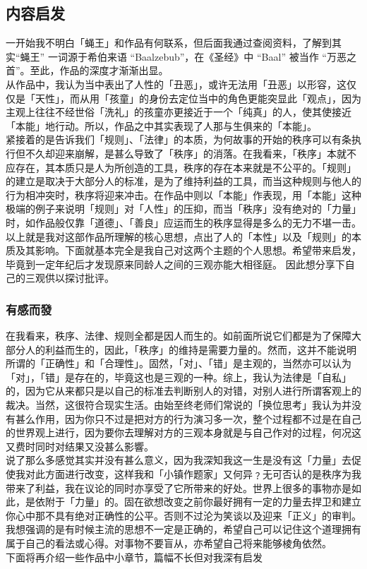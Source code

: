 \documentclass[supercite]{Experimental_Report}
\theoremstyle{definition}
\begin{document}
\subsection{内容启发}
一开始我不明白「蝇王」和作品有何联系，但后面我通过查阅资料，了解到其实“蝇王” 一词源于希伯来语 “Baalzebub”，在《圣经》中 “Baal” 被当作 “万恶之首”。至此，作品的深度才渐渐出显。
\\从作品中，我认为当中表出了人性的「丑恶」，或许无法用「丑恶」以形容，这仅仅是「天性」，而从用「孩童」的身份去定位当中的角色更能突显此「观点」，因为主观上往往不经世俗「洗礼」的孩童亦更接近于一个「纯真」的人，使其使接近「本能」地行动。所以，作品之中其实表现了人那与生俱来的「本能」。
\\紧接着的是告诉我们「规则」、「法律」的本质，为何故事的开始的秩序可以有条执行但不久却迎来崩解，是甚么导致了「秩序」的消落。在我看来，「秩序」本就不应存在，其本质只是人为所创造的工具，秩序的存在本来就是不公平的。「规则」的建立是取决于大部分人的标准，是为了维持利益的工具，而当这种规则与他人的行为相冲突时，秩序将迎来冲击。在作品中则以「本能」作表现，用「本能」这种极端的例子来说明「规则」对「人性」的压抑，而当「秩序」没有绝对的「力量」时，如作品般仅靠「道德」、「善良」应运而生的秩序显得是多么的无力不堪一击。
\\以上就是我对这部作品所理解的核心思想，点出了人的「本性」以及「规则」的本质及其影响。下面就基本完全是我自己对这两个主题的个人思想。希望带来启发，毕竟到一定年纪后才发现原来同龄人之间的三观亦能大相径庭。
因此想分享下自己的三观供以探讨批评。
\subsubsection{有感而發}
在我看来，秩序、法律、规则全都是因人而生的。如前面所说它们都是为了保障大部分人的利益而生的，因此，「秩序」的维持是需要力量的。然而，这并不能说明所谓的「正确性」和「合理性」。固然，「对」、「错」是主观的，当然亦可以认为「对」，「错」是存在的，毕竟这也是三观的一种。综上，我认为法律是「自私」的，因为它从来都只是以自己的标准去判断别人的对错，对别人进行所谓客观上的裁决。当然，这很符合现实生活。由始至终老师们常说的「换位思考」我认为并没有甚么作用，因为你只不过是把对方的行为演习多一次，整个过程都不过是在自己的世界观上进行，因为要你去理解对方的三观本身就是与自己作对的过程，何况这又费时同时对结果又没甚么影響。
\\说了那么多感觉其实并没有甚么意义，因为我深知我这一生是没有这「力量」去促使我对此方面进行改变，这样我和「小镇作题家」又何异﹖无可否认的是秩序为我带来了利益，我在议论的同时亦享受了它所带来的好处。世界上很多的事物亦是如此，是依附于「力量」的。固在欲想改变之前你最好拥有一定的力量去捍卫和建立你心中那不具有绝对正确性的公平。否则不过沦为笑谈以及迎来「正义」的审判。
\\我想强调的是有时候主流的思想不一定是正确的，希望自己可以记住这个道理拥有属于自己的看法或心得。对事物不要盲从，亦希望自己将来能够棱角依然。
\\下面将再介绍一些作品中小章节，篇幅不长但对我深有启发
	
\end{document}
